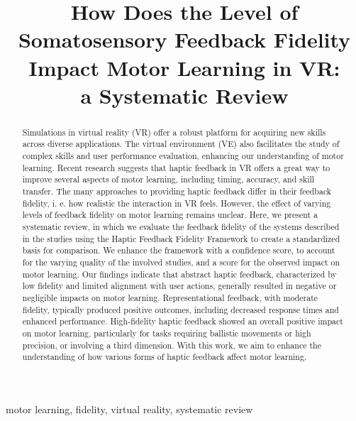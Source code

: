 \documentclass[conference]{IEEEtran}
\begin{document}
\title{How Does the Level of Somatosensory Feedback Fidelity Impact Motor Learning in VR: \\a Systematic Review}

\author{
\and
{}
\and
{}
}

\maketitle
\thispagestyle{plain}
\pagestyle{plain}

\begin{abstract}
Simulations in virtual reality (VR) offer a robust platform for acquiring new skills across diverse applications. The virtual environment (VE) also facilitates the study of complex skills and user performance evaluation, enhancing our understanding of motor learning. Recent research suggests that haptic feedback in VR offers a great way to improve several aspects of motor learning, including timing, accuracy, and skill transfer. The many approaches to providing haptic feedback differ in their feedback fidelity, i. e. how realistic the interaction in VR feels. However, the effect of varying levels of feedback fidelity on motor learning remains unclear. Here, we present a systematic review, in which we evaluate the feedback fidelity of the systems described in the studies using the Haptic Feedback Fidelity Framework to create a standardized basis for comparison. We enhance the framework with a confidence score, to account for the varying quality of the involved studies, and a score for the observed impact on motor learning. Our findings indicate that abstract haptic feedback, characterized by low fidelity and limited alignment with user actions, generally resulted in negative or negligible impacts on motor learning. Representational feedback, with moderate fidelity, typically produced positive outcomes, including decreased response times and enhanced performance. High-fidelity haptic feedback showed an overall positive impact on motor learning, particularly for tasks requiring ballistic movements or high precision, or involving a third dimension. With this work, we aim to enhance the understanding of how various forms of haptic feedback affect motor learning.

\end{abstract}

\begin{IEEEkeywords}
motor learning, fidelity, virtual reality, systematic review
\end{IEEEkeywords}










\newpage

\end{document}
